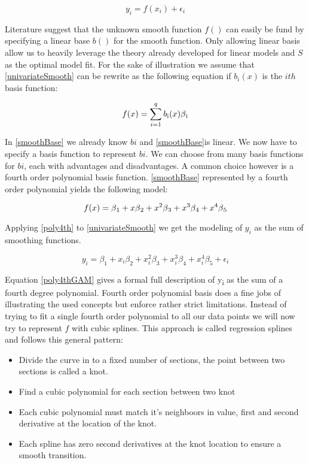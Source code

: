 \documentclass{article}
\begin{document}
    \begin{equation} \label{univariateSmooth} y_i = f(x_i) + \epsilon_i \end{equation}

    Literature suggest that the unknown smooth function $f()$ can easily be fund by specifying a linear base $b()$ for the smooth function. Only allowing linear basis allow us to heavily leverage the theory already developed for linear models and $S$ as the optimal model fit. For the sake of illustration we assume that \ref{univariateSmooth} can be rewrite as the following equation if $b_i(x)$ is the $ith$ basis function:

    \begin{equation} \label{smoothBase} f(x) = \sum_{i=1}^{q} b\textsubscript{i} (x) \beta \textsubscript{i} \end{equation}

    In \ref{smoothBase} we already know $bi$ and \ref{smoothBase}is linear. We now have to specify a basis function to represent $bi$. We can choose from many basis functions for $bi$, each with advantages and disadvantages. A common choice however is a fourth order polynomial basis function. \ref{smoothBase} represented by a fourth order polynomial yields the following model:

    \begin{equation} \label{poly4th} f(x) = \beta \textsubscript{1} + x\beta \textsubscript{2} + x^2\beta \textsubscript{3} + x^3\beta \textsubscript{4} + x^4\beta \textsubscript{5}  \end{equation}

    Applying \ref{poly4th} to \ref{univariateSmooth} we get the modeling of $y_i$ as the sum of smoothing functions.

    \begin{equation} \label{poly4thGAM}  y_i = \beta_1 + x_i\beta_2 + x_i^2\beta_3+ x_i^3\beta_4 + x_i^4\beta_5 + \epsilon_i \end{equation}

    Equation \ref{poly4thGAM} gives a formal full description of  y\textsubscript{i} as the sum of a fourth degree polynomial. Fourth order polynomial basis does a fine jobs of illustrating the used concepts but enforce rather strict limitations. Instead of trying to fit a single fourth order polynomial to all our data points we will now try to represent $f$ with cubic splines. This approach is called regression splines and follows this general pattern:

    \begin{itemize}

    \item Divide the curve in to a fixed number of sections, the point between two sections is called a knot.
    \item Find a cubic polynomial for each section between two knot
    \item Each cubic polynomial must match it's neighboors in value, first and second derivative at the location of the knot.
    \item Each spline has zero second derivatives at the knot location to ensure a smooth transition.

    \end{itemize}
\end{document}
